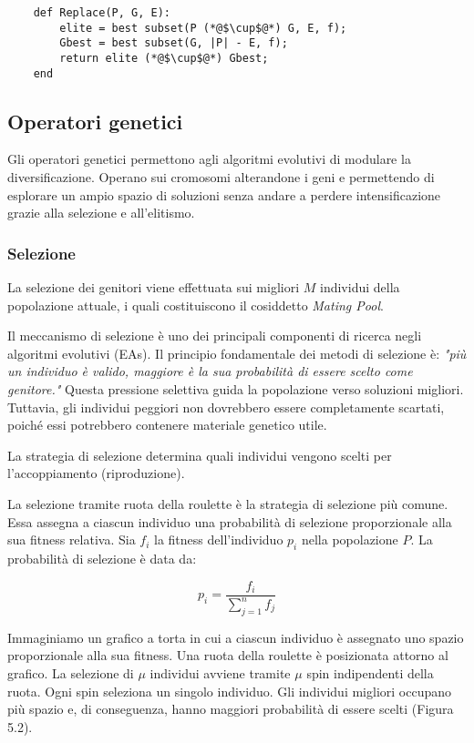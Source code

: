\begin{lstlisting}
    def Replace(P, G, E):
        elite = best subset(P (*@$\cup$@*) G, E, f);
        Gbest = best subset(G, |P| - E, f);
        return elite (*@$\cup$@*) Gbest;
    end
\end{lstlisting}

\subsection{Operatori genetici}

Gli operatori genetici permettono agli algoritmi evolutivi di modulare la diversificazione. Operano sui cromosomi alterandone i geni e permettendo di esplorare un ampio spazio di soluzioni senza andare a perdere intensificazione grazie alla selezione e all'elitismo.

\subsubsection{Selezione}

La selezione dei genitori viene effettuata sui migliori \( M \) individui della popolazione attuale, i quali costituiscono il cosiddetto \emph{Mating Pool}.

Il meccanismo di selezione è uno dei principali componenti di ricerca negli algoritmi evolutivi (EAs). Il principio fondamentale dei metodi di selezione è: \emph{"più un individuo è valido, maggiore è la sua probabilità di essere scelto come genitore."} Questa pressione selettiva guida la popolazione verso soluzioni migliori. Tuttavia, gli individui peggiori non dovrebbero essere completamente scartati, poiché essi potrebbero contenere materiale genetico utile.

La strategia di selezione determina quali individui vengono scelti per l'accoppiamento (riproduzione).

La selezione tramite ruota della roulette è la strategia di selezione più comune. Essa assegna a ciascun individuo una probabilità di selezione proporzionale alla sua fitness relativa. Sia $f_i$ la fitness dell'individuo $p_i$ nella popolazione $P$. La probabilità di selezione è data da:

\[ p_i = \frac{f_i}{\sum_{j=1}^{n} f_j} \]

Immaginiamo un grafico a torta in cui a ciascun individuo è assegnato uno spazio proporzionale alla sua fitness. Una ruota della roulette è posizionata attorno al grafico. La selezione di $\mu$ individui avviene tramite $\mu$ spin indipendenti della ruota. Ogni spin seleziona un singolo individuo. Gli individui migliori occupano più spazio e, di conseguenza, hanno maggiori probabilità di essere scelti (Figura 5.2).

